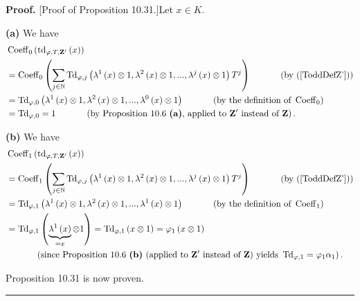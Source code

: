 \documentclass[numbers=enddot,12pt,final,onecolumn,notitlepage]{scrartcl}%
\newenvironment{proof}[1][Proof]{\noindent\textbf{#1.} }{\ \rule{0.5em}{0.5em}}
\begin{document}
\begin{proof}
[Proof of Proposition 10.31.]Let $x\in K$.

\textbf{(a)} We have%
\begin{align*}
&  \operatorname*{Coeff}\nolimits_{0}\left(  \operatorname*{td}%
\nolimits_{\varphi,T,\mathbf{Z}^{\prime}}\left(  x\right)  \right) \\
&  =\operatorname*{Coeff}\nolimits_{0}\left(  \sum_{j\in\mathbb{N}%
}\operatorname*{Td}\nolimits_{\varphi,j}\left(  \lambda^{1}\left(  x\right)
\otimes1,\lambda^{2}\left(  x\right)  \otimes1,...,\lambda^{j}\left(
x\right)  \otimes1\right)  T^{j}\right)  \ \ \ \ \ \ \ \ \ \ \left(  \text{by
(\ref{ToddDefZ'})}\right) \\
&  =\operatorname*{Td}\nolimits_{\varphi,0}\left(  \lambda^{1}\left(
x\right)  \otimes1,\lambda^{2}\left(  x\right)  \otimes1,...,\lambda
^{0}\left(  x\right)  \otimes1\right)  \ \ \ \ \ \ \ \ \ \ \left(  \text{by
the definition of }\operatorname*{Coeff}\nolimits_{0}\right) \\
&  =\operatorname*{Td}\nolimits_{\varphi,0}=1\ \ \ \ \ \ \ \ \ \ \left(
\text{by Proposition 10.6 \textbf{(a)}, applied to }\mathbf{Z}^{\prime}\text{
instead of }\mathbf{Z}\right)  .
\end{align*}


\textbf{(b)} We have%
\begin{align*}
&  \operatorname*{Coeff}\nolimits_{1}\left(  \operatorname*{td}%
\nolimits_{\varphi,T,\mathbf{Z}^{\prime}}\left(  x\right)  \right) \\
&  =\operatorname*{Coeff}\nolimits_{1}\left(  \sum_{j\in\mathbb{N}%
}\operatorname*{Td}\nolimits_{\varphi,j}\left(  \lambda^{1}\left(  x\right)
\otimes1,\lambda^{2}\left(  x\right)  \otimes1,...,\lambda^{j}\left(
x\right)  \otimes1\right)  T^{j}\right)  \ \ \ \ \ \ \ \ \ \ \left(  \text{by
(\ref{ToddDefZ'})}\right) \\
&  =\operatorname*{Td}\nolimits_{\varphi,1}\left(  \lambda^{1}\left(
x\right)  \otimes1,\lambda^{2}\left(  x\right)  \otimes1,...,\lambda
^{1}\left(  x\right)  \otimes1\right)  \ \ \ \ \ \ \ \ \ \ \left(  \text{by
the definition of }\operatorname*{Coeff}\nolimits_{1}\right) \\
&  =\operatorname*{Td}\nolimits_{\varphi,1}\left(  \underbrace{\lambda
^{1}\left(  x\right)  }_{=x}\otimes1\right)  =\operatorname*{Td}%
\nolimits_{\varphi,1}\left(  x\otimes1\right)  =\varphi_{1}\left(
x\otimes1\right) \\
&  \ \ \ \ \ \ \ \ \ \ \left(  \text{since Proposition 10.6 \textbf{(b)}
(applied to }\mathbf{Z}^{\prime}\text{ instead of }\mathbf{Z}\text{) yields
}\operatorname*{Td}\nolimits_{\varphi,1}=\varphi_{1}\alpha_{1}\right)  .
\end{align*}


Proposition 10.31 is now proven.
\end{proof}
\end{document}
